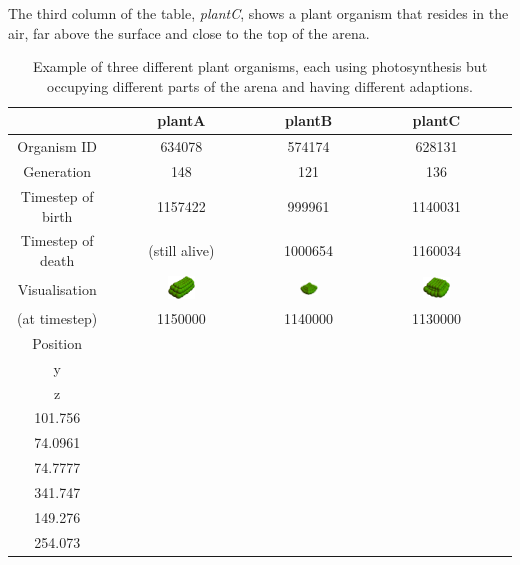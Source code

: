 The third column of the table, \emph{plantC}, shows a plant organism that resides in the air, far above the surface and close to the top of the arena.
\begin{table}[H]
 \begin{tabular}{ c || c | c | c |} 
    & plantA & plantB & plantC \\ [0.5ex] \hline \hline
     Organism ID & 634078 & 574174 & 628131 \\ \hline
     Generation & 148 & 121 & 136 \\ \hline
     Timestep of birth & 1157422 & 999961 & 1140031 \\ \hline
     Timestep of death & (still alive) & 1000654 & 1160034 \\ \hline
     Visualisation & 
        \includegraphics[width=0.2\textwidth]{figure/3orgs/plantA} &
        \includegraphics[width=0.2\textwidth]{figure/3orgs/plantB} &
        \includegraphics[width=0.2\textwidth]{figure/3orgs/plantC} \\
     (at timestep) & 1150000 & 1140000 & 1130000 \\ \hline
     Position \(\left(\begin{array}{l} x\\y\\z\end{array}\right)\) & 
        \(\left(\begin{array}{l} 172.198\\101.756\\74.0961 \end{array}\right)\) &
        \(\left(\begin{array}{l} 108.528\\ 74.7777\\ 341.747\end{array}\right)\) &
        \(\left(\begin{array}{l} 39.015\\ 149.276\\ 254.073\end{array}\right)\)\\ \hline
 \end{tabular}
\caption{Example of three different plant organisms, each using photosynthesis but occupying different parts of the arena and having different adaptions.}
\label{tab:3plants}
\end{table}

